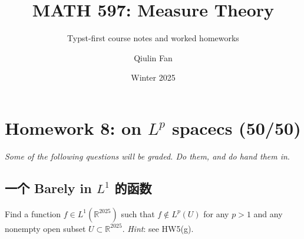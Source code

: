 \documentclass{qlnotes-export}
\title{MATH 597: Measure Theory}
\subtitle{Typst-first course notes and worked homeworks}
\author{Qiulin Fan}
\date{Winter 2025}
\begin{document}
\mainmatter
\chapter{\texorpdfstring{Homework 8: on \(L^{p}\) spacecs (50/50)}{Homework 8: on L\^{}\{p\} spacecs (50/50)}}\label{homework-8-on-lp-spacecs-5050}

\emph{Some of the following questions will be graded. Do them, and do hand them in}.

\section{\texorpdfstring{一个 Barely in \(L^{1}\) 的函数}{一个 Barely in L\^{}\{1\} 的函数}}\label{ux4e00ux4e2a-barely-in-l1-ux7684ux51fdux6570}

Find a function \(f \in L^{1}({\mathbb{R}}^{2025})\) such that \(f \notin L^{p}(U)\) for any \(p > 1\) and any nonempty open subset \(U \subset {\mathbb{R}}^{2025}\). \emph{Hint}: see HW5(g).
\end{document}
